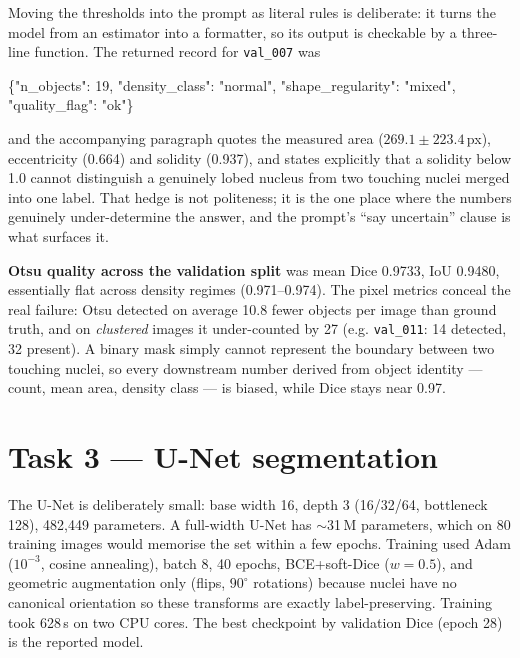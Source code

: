 \documentclass[a4paper,9pt,twocolumn]{extarticle}
\begin{document}
Moving the thresholds into the prompt as literal rules is deliberate: it turns
the model from an estimator into a formatter, so its output is checkable by a
three-line function. The returned record for \texttt{val\_007} was

{\footnotesize\ttfamily\{"n\_objects": 19, "density\_class": "normal",
"shape\_regularity": "mixed", "quality\_flag": "ok"\}}

\noindent and the accompanying paragraph quotes the measured area
($269.1\pm223.4$\,px), eccentricity (0.664) and solidity (0.937), and states
explicitly that a solidity below 1.0 cannot distinguish a genuinely lobed
nucleus from two touching nuclei merged into one label. That hedge is not
politeness; it is the one place where the numbers genuinely under-determine the
answer, and the prompt's ``say uncertain'' clause is what surfaces it.

\textbf{Otsu quality across the validation split} was mean Dice 0.9733, IoU
0.9480, essentially flat across density regimes (0.971--0.974). The pixel
metrics conceal the real failure: Otsu detected on average 10.8 fewer objects
per image than ground truth, and on \textit{clustered} images it under-counted
by 27 (e.g. \texttt{val\_011}: 14 detected, 32 present). A binary mask simply
cannot represent the boundary between two touching nuclei, so every downstream
number derived from object identity --- count, mean area, density class --- is
biased, while Dice stays near 0.97.

\section{Task 3 --- U-Net segmentation}

The U-Net is deliberately small: base width 16, depth 3 (16/32/64, bottleneck
128), 482{,}449 parameters. A full-width U-Net \cite{ronneberger2015} has
$\sim$31\,M parameters, which on 80 training images would memorise the set
within a few epochs. Training used Adam ($10^{-3}$, cosine annealing), batch 8,
40 epochs, BCE+soft-Dice ($w{=}0.5$), and geometric augmentation only (flips,
$90^\circ$ rotations) because nuclei have no canonical orientation so these
transforms are exactly label-preserving. Training took 628\,s on two CPU cores.
The best checkpoint by validation Dice (epoch 28) is the reported model.
\end{document}

